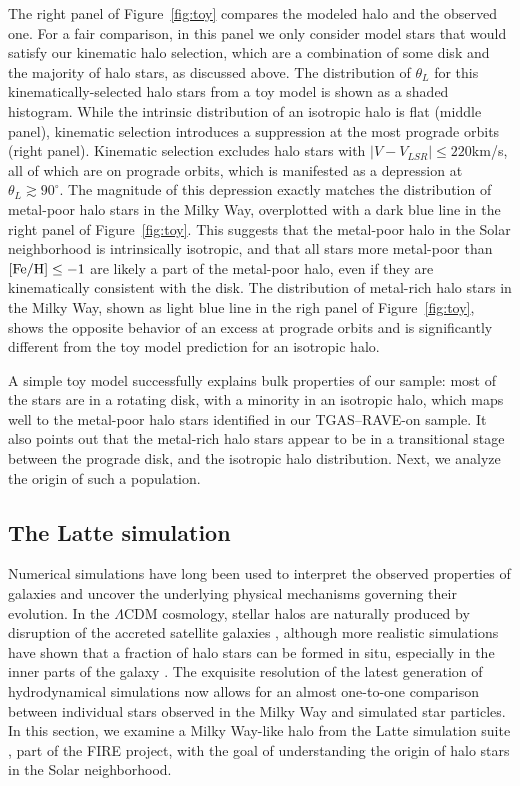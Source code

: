 \documentclass[apj, twocolappendix, numberedappendix, appendixfloats]{emulateapj}
\begin{document}
The right panel of Figure~\ref{fig:toy} compares the modeled halo and the observed one.
For a fair comparison, in this panel we only consider model stars that would satisfy our kinematic halo selection, which are a combination of some disk and the majority of halo stars, as discussed above.
The distribution of $\theta_L$ for this kinematically-selected halo stars from a toy model is shown as a shaded histogram.
While the intrinsic distribution of an isotropic halo is flat (middle panel), kinematic selection introduces a suppression at the most prograde orbits (right panel).
Kinematic selection excludes halo stars with $|V-V_{LSR}|\leq220$\;km/s, all of which are on prograde orbits, which is manifested as a depression at $\theta_L\gtrsim90^\circ$.
The magnitude of this depression exactly matches the distribution of metal-poor halo stars in the Milky Way, overplotted with a dark blue line in the right panel of Figure~\ref{fig:toy}.
This suggests that the metal-poor halo in the Solar neighborhood is intrinsically isotropic, and that all stars more metal-poor than $\rm[Fe/H]\leq-1$ are likely a part of the metal-poor halo, even if they are kinematically consistent with the disk.
The distribution of metal-rich halo stars in the Milky Way, shown as light blue line in the righ panel of Figure~\ref{fig:toy}, shows the opposite behavior of an excess at prograde orbits and is significantly different from the toy model prediction for an isotropic halo.

A simple toy model successfully explains bulk properties of our sample: most of the stars are in a rotating disk, with a minority in an isotropic halo, which maps well to the metal-poor halo stars identified in our TGAS--RAVE-on sample.
It also points out that the metal-rich halo stars appear to be in a transitional stage between the prograde disk, and the isotropic halo distribution.
Next, we analyze the origin of such a population.

\subsection{The Latte simulation}
\label{sec:latte}
Numerical simulations have long been used to interpret the observed properties of galaxies and uncover the underlying physical mechanisms governing their evolution.
In the $\Lambda$CDM cosmology, stellar halos are naturally produced by disruption of the accreted satellite galaxies \citep[e.g.,][]{bj2005, johnston2008}, although more realistic simulations have shown that a fraction of halo stars can be formed in situ, especially in the inner parts of the galaxy \citep[e.g.,][]{zolotov2009}.
The exquisite resolution of the latest generation of hydrodynamical simulations now allows for an almost one-to-one comparison between individual stars observed in the Milky Way and simulated star particles.
In this section, we examine a Milky Way-like halo from the Latte simulation suite \citep{wetzel2016}, part of the FIRE project, with the goal of understanding the origin of halo stars in the Solar neighborhood.
\end{document}
